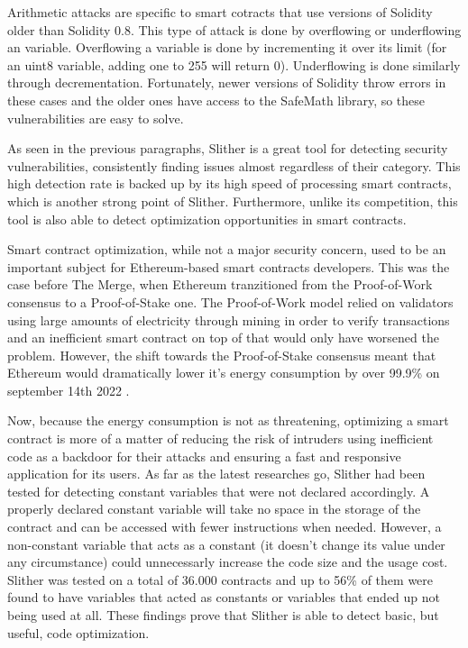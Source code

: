 Arithmetic attacks \cite{arithmeticAttack} are specific to smart cotracts that use versions of Solidity older than Solidity 0.8. This type of attack is done by overflowing or underflowing an variable. Overflowing a variable is done by incrementing it over its limit (for an uint8 variable, adding one to 255 will return 0). Underflowing is done similarly through decrementation. Fortunately, newer versions of Solidity throw errors in these cases and the older ones have access to the SafeMath library, so these vulnerabilities are easy to solve.

As seen in the previous paragraphs, Slither is a great tool for detecting security vulnerabilities, consistently finding issues almost regardless of their category. This high detection rate is backed up by its high speed of processing smart contracts, which is another strong point of Slither. Furthermore, unlike its competition, this tool is also able to detect optimization opportunities in smart contracts.

Smart contract optimization, while not a major security concern, used to be an important subject for Ethereum-based smart contracts developers. This was the case before The Merge, when Ethereum tranzitioned from the Proof-of-Work consensus to a Proof-of-Stake one. The Proof-of-Work model relied on validators using large amounts of electricity through mining in order to verify transactions and an inefficient smart contract on top of that would only have worsened the problem. However, the shift towards the Proof-of-Stake consensus meant that Ethereum would dramatically lower it's energy consumption by over 99.9\% on september 14th 2022 \cite{ethereumLowerElectricity}.

Now, because the energy consumption is not as threatening, optimizing a smart contract is more of a matter of reducing the risk of intruders using inefficient code as a backdoor for their attacks and ensuring a fast and responsive application for its users. As far as the latest researches go, Slither \cite{slither} had been tested for detecting constant variables that were not declared accordingly. A properly declared constant variable will take no space in the storage of the contract and can be accessed with fewer instructions when needed. However, a non-constant variable that acts as a constant (it doesn't change its value under any circumstance) could unnecessarly increase the code size and the usage cost. Slither was tested on a total of 36.000 contracts and up to 56\% of them were found to have variables that acted as constants or variables that ended up not being used at all. These findings prove that Slither is able to detect basic, but useful, code optimization.

